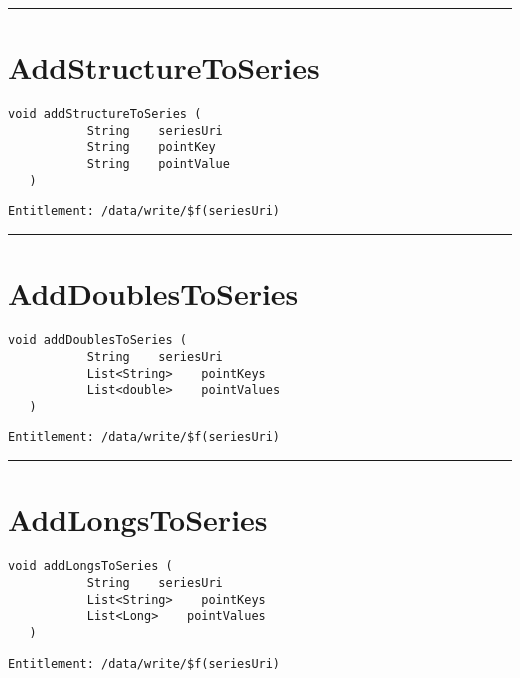 \rule{12cm}{2pt}
\section{AddStructureToSeries}
\label{Api:AddStructureToSeries}
\begin{lstlisting}[style=nonumbers]
   void addStructureToSeries (
           String    seriesUri
           String    pointKey
           String    pointValue
   )
\end{lstlisting}
\begin{Verbatim}[formatcom=\color{Maroon}]
  Entitlement: /data/write/$f(seriesUri)
\end{Verbatim}



\rule{12cm}{2pt}
\section{AddDoublesToSeries}
\label{Api:AddDoublesToSeries}
\begin{lstlisting}[style=nonumbers]
   void addDoublesToSeries (
           String    seriesUri
           List<String>    pointKeys
           List<double>    pointValues
   )
\end{lstlisting}
\begin{Verbatim}[formatcom=\color{Maroon}]
  Entitlement: /data/write/$f(seriesUri)
\end{Verbatim}



\rule{12cm}{2pt}
\section{AddLongsToSeries}
\label{Api:AddLongsToSeries}
\begin{lstlisting}[style=nonumbers]
   void addLongsToSeries (
           String    seriesUri
           List<String>    pointKeys
           List<Long>    pointValues
   )
\end{lstlisting}
\begin{Verbatim}[formatcom=\color{Maroon}]
  Entitlement: /data/write/$f(seriesUri)
\end{Verbatim}



